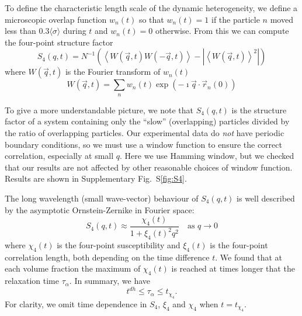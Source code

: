 \documentclass[prl,twocolumn,notitlepage]{revtex4-1}
\begin{document}
To define the characteristic length scale of the dynamic heterogeneity, we define a microscopic overlap function $w_n(t)$ so that $w_n(t)=1$ if the particle $n$ moved less than $0.3\langle\sigma\rangle$ during $t$ and $w_n(t)=0$ otherwise. From this we can compute the four-point structure factor~\cite{Flenner2011}
\begin{equation}
	S_4(q,t) = N^{-1}(\left\langle W(\vec{q},t) W(-\vec{q},t) \right\rangle - | \left\langle W(\vec{q},t) \right\rangle^2 |)
	\label{eq:S4}
\end{equation}
where $W(\vec{q},t)$ is the Fourier transform of $w_n(t)$
\begin{equation}
	W(\vec{q},t) = \sum_n w_n(t)\exp(-\imath \vec{q}\cdot\vec{r}_n(0))
\end{equation}

To give a more understandable picture, we note that $S_4(q,t)$ is the structure factor of a system containing only the ``slow'' (overlapping) particles divided by the ratio of overlapping particles. Our experimental data do \emph{not} have periodic boundary conditions, so we must use a window function to ensure the correct correlation, especially at small $q$. Here we use Hamming window, but we checked that our results are not affected by other reasonable choices of window function. Results are shown in Supplementary Fig.~S\ref{fig:S4}.

The long wavelength (small wave-vector) behaviour of $S_4(q,t)$ is well described by the asymptotic Ornstein-Zernike in Fourier space:
\begin{equation}
	S_4(q,t) \approx \frac{\chi_4(t)}{1+\xi_4(t)^2 q^2} \quad \text{as } q\rightarrow 0
	\label{eq:OZ_Fourier}
\end{equation}
where $\chi_4(t)$ is the four-point susceptibility and $\xi_4(t)$ is the four-point correlation length, both depending on the time difference $t$. We found that at each volume fraction the maximum of $\chi_4(t)$ is reached at times longer that the relaxation time $\tau_\alpha$. In summary, we have
\begin{equation}
t^{dh} \leq \tau_\alpha \leq t_{\chi_4}.
\end{equation}
For clarity, we omit time dependence in $S_4$, $\xi_4$ and $\chi_4$ when $t=t_{\chi_4}$.
\end{document}
